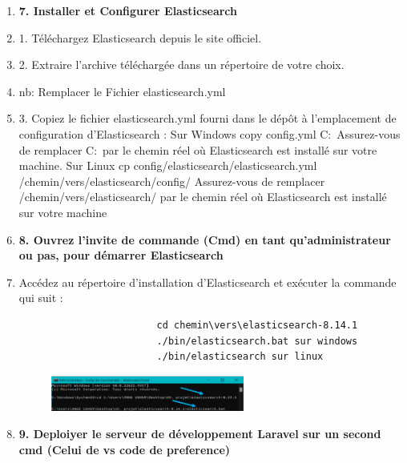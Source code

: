 \documentclass[12pt]{article}
\begin{document}
\begin{enumerate}
                \item \textbf{7. Installer et Configurer Elasticsearch}
                    \item 1. Téléchargez Elasticsearch depuis le site officiel.
                    \item 2. Extraire l'archive téléchargée dans un répertoire de votre choix.
                        \item nb: Remplacer le Fichier elasticsearch.yml
                    \item 3. Copiez le fichier elasticsearch.yml fourni dans le dépôt à l'emplacement de configuration d'Elasticsearch : 
                        Sur Windows
                            copy config\elasticsearch\elasticsearch.yml C:\chemin\vers\elasticsearch\config\
                          Assurez-vous de remplacer C:\chemin\vers\elasticsearch\ par le chemin réel où Elasticsearch est installé sur votre machine.
                        Sur Linux
                            cp config/elasticsearch/elasticsearch.yml /chemin/vers/elasticsearch/config/
                        Assurez-vous de remplacer /chemin/vers/elasticsearch/ par le chemin réel où Elasticsearch est installé sur votre machine
                \item \textbf{8. Ouvrez l'invite de commande (Cmd) en tant qu’administrateur ou pas, pour démarrer Elasticsearch}
                    \item Accédez au répertoire d'installation d'Elasticsearch et exécuter la commande qui suit :
                    \begin{lstlisting}
                        cd chemin\vers\elasticsearch-8.14.1
                        ./bin/elasticsearch.bat sur windows
                        ./bin/elasticsearch sur linux
                    \end{lstlisting}
                    \begin{figure}[h] 
                        \centering 
                        \includegraphics[width=0.6\textwidth]{./img/elastix.png} 
                    \end{figure}
                \item \textbf{9. Deploiyer le serveur de développement Laravel sur un second cmd (Celui de vs code de preference)}
                    \begin{itemize}

\end{itemize}
\end{enumerate}
\end{document}
